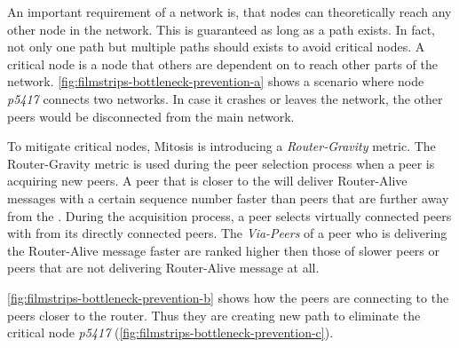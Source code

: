 An important requirement of a network is, that nodes can theoretically reach any other node in the network. This is guaranteed as long as a path exists. In fact, not only one path but multiple paths should exists to avoid critical nodes. A critical node is a node that others are dependent on to reach other parts of the network. \vref{fig:filmstrips-bottleneck-prevention-a} shows a scenario where node \textit{p5417} connects two networks. In case it crashes or leaves the network, the other peers would be disconnected from the main network.

To mitigate critical nodes, Mitosis is introducing a \textit{Router-Gravity} metric. The Router-Gravity metric is used during the peer selection process when a peer is acquiring new peers. A peer that is closer to the \router will deliver Router-Alive messages with a certain sequence number faster than peers that are further away from the \router.
During the acquisition process, a peer selects virtually connected peers with from its directly connected peers. The \textit{Via-Peers} of a peer who is delivering the Router-Alive message faster are ranked higher then those of slower peers or peers that are not delivering Router-Alive message at all.

\vref{fig:filmstrips-bottleneck-prevention-b} shows how the peers are connecting to the peers closer to the router. Thus they are creating new path to eliminate the critical node \textit{p5417} (\vref{fig:filmstrips-bottleneck-prevention-c}).
